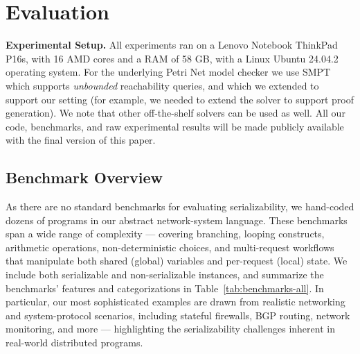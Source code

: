 \section{Evaluation}
\label{sec:evaluation}



\noindent
\textbf{Experimental Setup.}
All experiments ran on a Lenovo Notebook ThinkPad P16s, with 16 AMD cores and a RAM of 58 GB, with a Linux Ubuntu 24.04.2 operating system.
%
%
For the underlying Petri Net model checker we use SMPT~\cite{AmDa23} which supports \textit{unbounded} reachability queries, and which we extended to support our setting (for example, we needed to extend the solver to support proof generation). 
%
We note that other off-the-shelf solvers can be used as well.
%
All our code, benchmarks, and raw experimental results will be made publicly available with the final version of this paper.
 


\subsection{Benchmark Overview} 
\label{subsec:benchmarks}

As there are no standard benchmarks for evaluating serializability, we hand-coded dozens of programs in our abstract network-system language. These benchmarks span a wide range of complexity --- covering branching, looping constructs, arithmetic operations, non-deterministic choices, and multi-request workflows that manipulate both shared (global) variables and per-request (local) state. 
%
We include both serializable and non-serializable instances, and summarize the benchmarks' features and categorizations in Table~\ref{tab:benchmarks-all}. 
%
In particular, our most sophisticated examples are drawn from realistic networking and system-protocol scenarios, including stateful firewalls, BGP routing, network monitoring, and more --- highlighting the serializability challenges inherent in real-world distributed programs.

